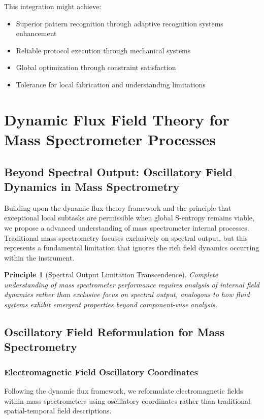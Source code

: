 \documentclass[11pt,a4paper]{article}
\newtheorem{principle}[theorem]{Principle}
\theoremstyle{remark}
\begin{document}
This integration might achieve:
\begin{itemize}
\item Superior pattern recognition through adaptive recognition systems enhancement
\item Reliable protocol execution through mechanical systems
\item Global optimization through constraint satisfaction
\item Tolerance for local fabrication and understanding limitations
\end{itemize}

\section{Dynamic Flux Field Theory for Mass Spectrometer Processes}

\subsection{Beyond Spectral Output: Oscillatory Field Dynamics in Mass Spectrometry}

Building upon the dynamic flux theory framework and the principle that exceptional local subtasks are permissible when global S-entropy remains viable, we propose a advanced understanding of mass spectrometer internal processes. Traditional mass spectrometry focuses exclusively on spectral output, but this represents a fundamental limitation that ignores the rich field dynamics occurring within the instrument.

\begin{principle}[Spectral Output Limitation Transcendence]
Complete understanding of mass spectrometer performance requires analysis of internal field dynamics rather than exclusive focus on spectral output, analogous to how fluid systems exhibit emergent properties beyond component-wise analysis.
\end{principle}

\subsection{Oscillatory Field Reformulation for Mass Spectrometry}

\subsubsection{Electromagnetic Field Oscillatory Coordinates}

Following the dynamic flux framework, we reformulate electromagnetic fields within mass spectrometers using oscillatory coordinates rather than traditional spatial-temporal field descriptions.
\end{document}
